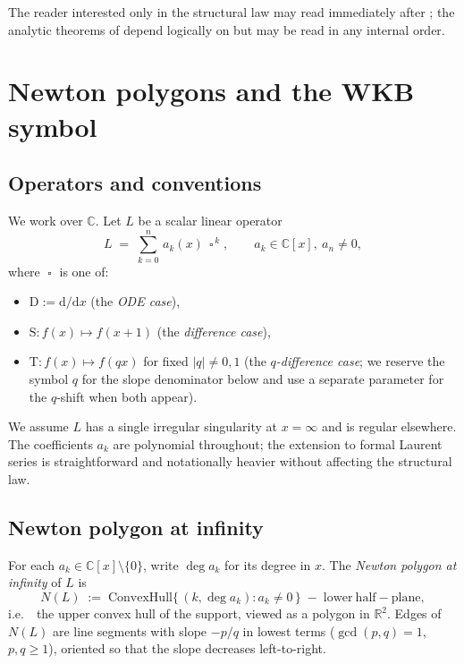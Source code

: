 \documentclass[aip,jmp,preprint,amsmath,amssymb,nofootinbib,floatfix]{revtex4-2}
\theoremstyle{plain}
\theoremstyle{definition}
\theoremstyle{remark}
\newcommand{\op}{\mathop{\square}}                %
\newcommand{\opD}{\mathrm{D}}                     %
\newcommand{\opS}{\mathrm{S}}                     %
\newcommand{\opT}{\mathrm{T}}                     %
\newcommand{\NL}{N(L)}
\newcommand{\ie}{i.e.\ }
\begin{document}
\bigskip
The reader interested only in the structural law may read
 immediately after ; the analytic
theorems of  depend logically on
 but may be read in any internal order.



\section{Newton polygons and the WKB symbol}\label{sec:prelim}

\subsection{Operators and conventions}\label{ssec:prelim-ops}

We work over $\mathbb{C}$. Let $L$ be a scalar linear operator
\[
   L \;=\; \sum_{k=0}^{n}\, a_k(x)\, \op^{\,k},
   \qquad a_k \in \mathbb{C}[x],\ a_n \ne 0,
\]
where $\op$ is one of:
\begin{itemize}[leftmargin=2em]
\item $\opD := \mathrm{d}/\mathrm{d}x$ \quad (the \emph{ODE case}),
\item $\opS \colon f(x) \mapsto f(x+1)$ \quad (the \emph{difference case}),
\item $\opT \colon f(x) \mapsto f(qx)$ for fixed $|q| \ne 0, 1$ \quad
      (the \emph{$q$-difference case}; we reserve the symbol $q$ for the
      slope denominator below and use a separate parameter for the
      $q$-shift when both appear).
\end{itemize}
We assume $L$ has a single irregular singularity at $x = \infty$ and is
regular elsewhere. The coefficients $a_k$ are polynomial throughout; the
extension to formal Laurent series is straightforward and notationally
heavier without affecting the structural law.

\subsection{Newton polygon at infinity}\label{ssec:prelim-Newton}

For each $a_k \in \mathbb{C}[x] \setminus \{0\}$, write $\deg a_k$ for its
degree in $x$. The \emph{Newton polygon at infinity} of $L$ is
\[
   \NL \;:=\;
   \mathrm{ConvexHull}\big\{\,(k, \deg a_k) : a_k \ne 0\,\big\}
   \;-\; \mathrm{lower\ half\!-plane},
\]
\ie\ the upper convex hull of the support, viewed as a polygon in
$\mathbb{R}^2$. Edges of $\NL$ are line segments with slope $-p/q$ in
lowest terms ($\gcd(p, q) = 1$, $p, q \ge 1$), oriented so that the slope
decreases left-to-right.
\end{document}
